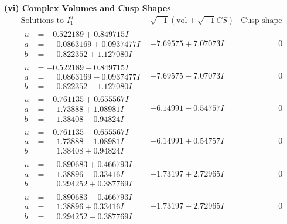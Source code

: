 \documentclass[1p]{elsarticle_modified}
\theoremstyle{definition}
\newcommand{\I}{\sqrt{-1}}
\begin{document}
\newpage\flushleft \textbf{(vi) Complex Volumes and Cusp Shapes}
$$\begin{array}{c|c|c}  
\text{Solutions to }I^u_{1}& \I (\text{vol} + \sqrt{-1}CS) & \text{Cusp shape}\\
 \hline 
\begin{aligned}
u &= -0.522189 + 0.849715 I \\
a &= \phantom{-}0.0863169 + 0.0937477 I \\
b &= \phantom{-}0.822352 + 1.127080 I\end{aligned}
 & -7.69575 + 7.07073 I & \phantom{-0.000000 } 0 \\ \hline\begin{aligned}
u &= -0.522189 - 0.849715 I \\
a &= \phantom{-}0.0863169 - 0.0937477 I \\
b &= \phantom{-}0.822352 - 1.127080 I\end{aligned}
 & -7.69575 - 7.07073 I & \phantom{-0.000000 } 0 \\ \hline\begin{aligned}
u &= -0.761135 + 0.655567 I \\
a &= \phantom{-}1.73888 + 1.08981 I \\
b &= \phantom{-}1.38408 - 0.94824 I\end{aligned}
 & -6.14991 - 0.54757 I & \phantom{-0.000000 } 0 \\ \hline\begin{aligned}
u &= -0.761135 - 0.655567 I \\
a &= \phantom{-}1.73888 - 1.08981 I \\
b &= \phantom{-}1.38408 + 0.94824 I\end{aligned}
 & -6.14991 + 0.54757 I & \phantom{-0.000000 } 0 \\ \hline\begin{aligned}
u &= \phantom{-}0.890683 + 0.466793 I \\
a &= \phantom{-}1.38896 - 0.33416 I \\
b &= \phantom{-}0.294252 + 0.387769 I\end{aligned}
 & -1.73197 + 2.72965 I & \phantom{-0.000000 } 0 \\ \hline\begin{aligned}
u &= \phantom{-}0.890683 - 0.466793 I \\
a &= \phantom{-}1.38896 + 0.33416 I \\
b &= \phantom{-}0.294252 - 0.387769 I\end{aligned}
 & -1.73197 - 2.72965 I & \phantom{-0.000000 } 0 \\ \hline\begin{aligned}

\end{aligned}
\end{array}$$
\end{document}

